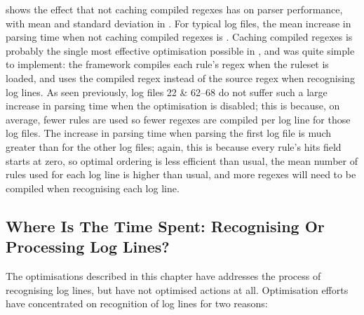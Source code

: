 shows the effect that not caching compiled regexes has on parser
performance, with mean and standard deviation in .  For typical log
files, the mean increase in parsing time when not caching compiled regexes
is .  Caching
compiled regexes is probably the single most effective optimisation
possible in \parsername{}, and was quite simple to implement: the framework
compiles each rule's regex when the ruleset is loaded, and uses the
compiled regex instead of the source regex when recognising log lines.  As
seen previously, log files 22 \& 62--68 do not suffer such a large increase
in parsing time when the optimisation is disabled; this is because, on
average, fewer rules are used so fewer regexes are compiled per log line
for those log files.  The increase in parsing time when parsing the first
log file is much greater than for the other log files; again, this is
because every rule's hits field starts at zero, so optimal ordering is less
efficient than usual, the mean number of rules used for each log line is
higher than usual, and more regexes will need to be compiled when
recognising each log line.



\FloatBarrier{}

\subsection{Where Is The Time Spent: Recognising Or Processing Log Lines?}

\label{recognising vs processing}

The optimisations described in this chapter have addresses the process of
recognising log lines, but have not optimised actions at all.  Optimisation
efforts have concentrated on recognition of log lines for two reasons:

